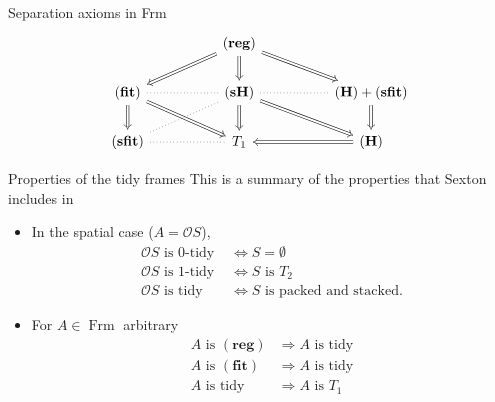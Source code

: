 \documentclass[compress,12pt]{beamer}
\DeclareMathOperator{\Frm}{Frm}
\begin{document}
\begin{frame}[fragile]{Separation axioms in Frm}
\[\begin{tikzcd}
	&& {\mathbf{(reg)}} \\
	{\mathbf{(fit)}} && {\mathbf{(sH)}} && {\mathbf{(H)}+\mathbf{(sfit)}} \\
	{\mathbf{(sfit)}} && {T_1} && {\mathbf{(H)}}
	\arrow[Rightarrow, from=1-3, to=2-1]
	\arrow[Rightarrow, from=1-3, to=2-3]
	\arrow[Rightarrow, from=1-3, to=2-5]
	\arrow[Rightarrow, from=2-1, to=3-1]
	\arrow[Rightarrow, from=2-1, to=3-3]
	\arrow[dotted, no head, from=2-3, to=2-1]
	\arrow[dotted, no head, from=2-3, to=2-5]
	\arrow[dotted, no head, from=2-3, to=3-1]
	\arrow[Rightarrow, from=2-3, to=3-3]
	\arrow[Rightarrow, from=2-3, to=3-5]
	\arrow[Rightarrow, from=2-5, to=3-5]
	\arrow[dotted, no head, from=3-1, to=3-3]
	\arrow[Rightarrow, from=3-5, to=3-3]
\end{tikzcd}\]
\end{frame}

\begin{frame}{Properties of the tidy frames}
This is a summary of the properties that Sexton includes in \cite{R.S.3}
\begin{itemize}
\item In the spatial case ($A=\mathcal{O}S$),
\[
\begin{split}
\mathcal{O}S \mbox{ is 0-tidy } & \iff S=\emptyset \\
\mathcal{O}S \mbox{ is 1-tidy } & \iff S \mbox{ is }T_2 \\
\mathcal{O}S \mbox{ is tidy } & \iff S \mbox{ is packed and stacked}.
\end{split}
\]

\item For $A\in \Frm$ arbitrary
\[
\begin{split}
A\mbox{ is }\mathbf{(reg)} & \Rightarrow A \mbox{ is tidy}\\
A\mbox{ is }\mathbf{(fit)} & \Rightarrow A \mbox{ is tidy}\\
A\mbox{ is tidy } & \Rightarrow A\mbox{ is } T_1
\end{split}
\]
\end{itemize}
\end{frame}
\end{document}
